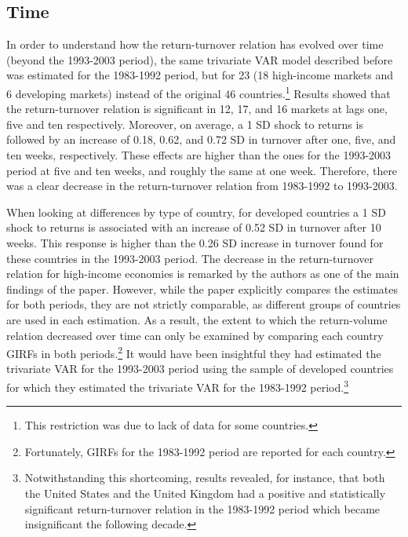 \documentclass[final,3p,times,twocolumn]{elsarticle}
\begin{document}
\subsection{Time}

In order to understand how the return-turnover relation has evolved over time (beyond the 1993-2003 period), the same trivariate VAR model described before was estimated for the 1983-1992 period, but for 23 (18 high-income markets and 6 developing markets) instead of the original 46 countries.\footnote{This restriction was due to lack of data for some countries.} Results showed that the return-turnover relation is significant in 12, 17, and 16 markets at lags one, five and ten respectively. Moreover, on average, a 1 SD shock to returns is followed by an increase of 0.18, 0.62, and 0.72 SD in turnover after one, five, and ten weeks, respectively. These effects are higher than the ones for the 1993-2003 period at five and ten weeks, and roughly the same at one week. Therefore, there was a clear decrease in the return-turnover relation from 1983-1992 to 1993-2003.\par

When looking at differences by type of country, for developed countries a 1 SD shock to returns is associated with an increase of 0.52 SD in turnover after 10 weeks. This response is higher than the 0.26 SD increase in turnover found for these countries in the 1993-2003 period. The decrease in the return-turnover relation for high-income economies is remarked by the authors as one of the main findings of the paper. However, while the paper explicitly compares the estimates for both periods, they are not strictly comparable, as different groups of countries are used in each estimation. As a result, the extent to which the return-volume relation decreased over time can only be examined by comparing each country GIRFs in both periods.\footnote{Fortunately, GIRFs for the 1983-1992 period are reported for each country.} It would have been insightful they had estimated the  trivariate VAR for the 1993-2003 period using the sample of developed countries for which they estimated the trivariate VAR for the 1983-1992 period.\footnote{Notwithstanding this shortcoming, results revealed, for instance, that both the United States and the United Kingdom had a positive and statistically significant return-turnover relation in the 1983-1992 period which became insignificant the following decade.}\par
\end{document}
